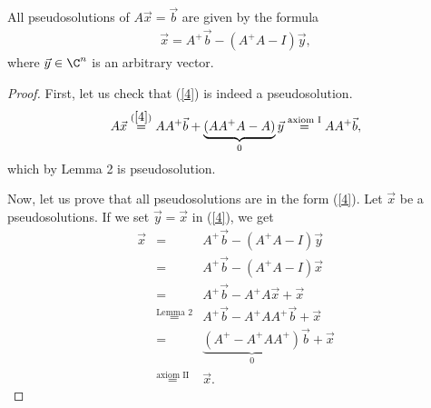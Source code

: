     \begin{proposition}{}{}
        All pseudosolutions of $A\vec{x} = \vec{b}$ are given by the formula
        \begin{eqnarray}
            \vec{x} = A^+\vec{b} - (A^+A-I)\vec{y},\label{4}
        \end{eqnarray}
        where $\vec{y} \in \C^n$ is an arbitrary vector.
    \end{proposition}
    \begin{proof}
        First, let us check that (\ref{4}) is indeed a pseudosolution. 
        \[
            A\vec{x}
            \stackrel{(\ref{4})}{=}AA^+\vec{b}+\underbrace{(AA^+A-A)}_{0}\vec{y}
            \stackrel{\text{axiom I}}{=}AA^+\vec{b},
        \]
        which by Lemma 2 is pseudosolution.

        Now, let us prove that all pseudosolutions are in the form (\ref{4}). Let $\vec{x}$ be a pseudosolutions. If we set $\vec{y}=\vec{x}$ in (\ref{4}), we get
        \begin{eqnarray}
             \vec{x}&=&A^+\vec{b} - (A^+A-I)\vec{y}\nonumber\\
             &=&A^+\vec{b} - (A^+A-I)\vec{x}\nonumber\\
             &=&A^+\vec{b} -A^+A\vec{x}+\vec{x}\nonumber\\
             &\stackrel{\text{Lemma 2}}{=}&A^+\vec{b} -A^+AA^+\vec{b}+\vec{x}\nonumber\\
             &=&\underbrace{(A^+ -A^+AA^+)}_{0}\vec{b}+\vec{x}\nonumber\\
            &\stackrel{\text{axiom II}}{=}&\vec{x}.\nonumber
        \end{eqnarray}
    \end{proof}
    

